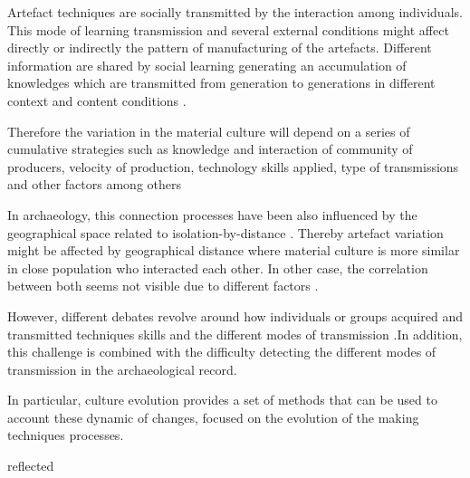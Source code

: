 \documentclass[review]{elsarticle}
\begin{document}
Artefact techniques are socially transmitted by the interaction among individuals.
This mode of learning transmission and several external conditions might affect directly or indirectly the pattern of manufacturing of the artefacts. Different information are shared by social learning generating an accumulation of knowledges which are transmitted from generation to generations in different context and content conditions  \citep{eerkens_jelmer_cultural_2005, neff1992ceramics,henrich_evolution_2003, boyd_cultural_2011}. 

Therefore the variation in the material culture will depend on a series of cumulative strategies such as knowledge and interaction of community of producers, velocity of production, technology skills applied, type of transmissions and other factors among others %

In archaeology, this connection processes have been also influenced by the geographical space related to isolation-by-distance \citep{bjorklund_effect_2010,shennan_isolation-by-distance_2015, van_strien_isolation-by-distance_2015}. Thereby artefact variation might be affected by geographical distance where material culture is more similar in close population who interacted each other. In other case, the correlation between both seems not visible due to different factors \citep{hart_effects_2012}. 

However, different debates revolve around how individuals or groups acquired and transmitted techniques skills and the different modes of transmission   \citep{bowser_learning_2008, mesoudi_cultural_2008, roux_standardization_2015}.In  addition, this challenge is combined with the difficulty detecting the different modes of transmission in the archaeological record.     



In particular, culture evolution provides a set of methods that can be used to account these dynamic of changes, focused on the evolution of the making techniques processes. 





reflected                                 
\end{document}
